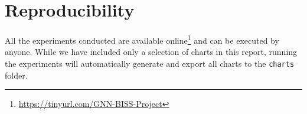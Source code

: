 \documentclass[11pt]{article}
\begin{document}
\section{Reproducibility}
All the experiments conducted are available 
%
online\footnote{\url{https://tinyurl.com/GNN-BISS-Project}} 
%
and can be executed by anyone. 
%
While we have included only a selection of charts in this report, running the 
%
experiments will automatically generate and export all charts to the \texttt{charts} folder.







\end{document}
